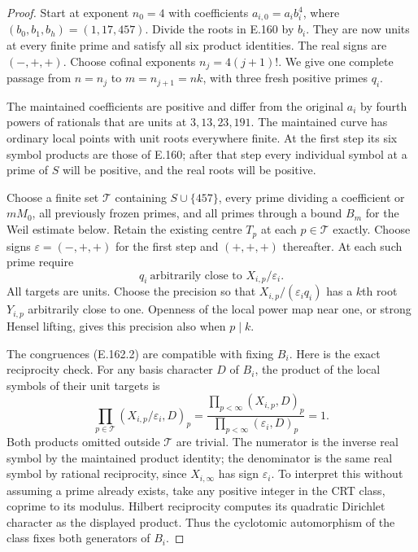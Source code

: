 \begin{proof}
Start at exponent $n_0=4$ with coefficients
$a_{i,0}=a_i b_i^4$, where $(b_0,b_1,b_h)=(1,17,457)$.
Divide the roots in E.160 by $b_i$.  They are now units at
every finite prime and satisfy all six product identities.
The real signs are $(-,+,+)$.  Choose cofinal exponents
$n_j=4(j+1)!$.  We give one complete passage from $n=n_j$
to $m=n_{j+1}=n k$, with three fresh positive primes $q_i$.

The maintained coefficients are positive and differ from
the original $a_i$ by fourth powers of rationals that are
units at $3,13,23,191$.  The maintained curve has ordinary
local points with unit roots everywhere finite.  At the
first step its six symbol products are those of E.160;
after that step every individual symbol at a prime of $S$
will be positive, and the real roots will be positive.

Choose a finite set $\mathcal T$ containing $S\cup\{457\}$,
every prime dividing a coefficient or $mM_0$, all previously
frozen primes, and all primes through a bound $B_m$ for the
Weil estimate below.  Retain the existing centre $T_p$ at
each $p\in\mathcal T$ exactly.  Choose signs
$\varepsilon=(-,+,+)$ for the first step and $(+,+,+)$
thereafter.  At each such prime require
\[
 q_i\ \text{arbitrarily close to }X_{i,p}/\varepsilon_i.
\tag{E.162.2}
\]
All targets are units.  Choose the precision so that
$X_{i,p}/(\varepsilon_iq_i)$ has a $k$th root $Y_{i,p}$
arbitrarily close to one.  Openness of the local power map
near one, or strong Hensel lifting, gives this precision
also when $p\mid k$.

The congruences (E.162.2) are compatible with fixing $B_i$.
Here is the exact reciprocity check.  For any basis character
$D$ of $B_i$, the product of the local symbols of their unit
targets is
\[
 \prod_{p\in\mathcal T}(X_{i,p}/\varepsilon_i,D)_p
 =\frac{\prod_{p<\infty}(X_{i,p},D)_p}
        {\prod_{p<\infty}(\varepsilon_i,D)_p}=1.
\tag{E.162.3}
\]
Both products omitted outside $\mathcal T$ are trivial.
The numerator is the inverse real symbol by the maintained
product identity; the denominator is the same real symbol
by rational reciprocity, since $X_{i,\infty}$ has sign
$\varepsilon_i$.  To interpret this without assuming a prime
already exists, take any positive integer in the CRT class,
coprime to its modulus.  Hilbert reciprocity computes its
quadratic Dirichlet character as the displayed product.
Thus the cyclotomic automorphism of the class fixes both
generators of $B_i$.


\end{proof}
